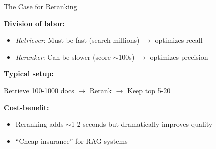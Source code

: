 \documentclass[11pt,compress,t,notes=noshow, xcolor=table]{beamer}
\begin{document}
\begin{frame}{The Case for Reranking}

\vfill

\textbf{Division of labor:}

\begin{itemize}
    \item \textit{Retriever}: Must be fast (search millions) $\rightarrow$ optimizes recall
    \item \textit{Reranker}: Can be slower (score $\sim$100s) $\rightarrow$ optimizes precision
\end{itemize}

\vspace{1em}

\textbf{Typical setup:} 
\begin{center}
	Retrieve 100-1000 docs $\rightarrow$ Rerank $\rightarrow$ Keep top 5-20
\end{center}

\vspace{1em}

\textbf{Cost-benefit:} 

\begin{itemize}
	\item Reranking adds $\sim$1-2 seconds but dramatically improves quality
	\item ``Cheap insurance'' for RAG systems
\end{itemize}

\vfill

\end{frame}

\end{document}
